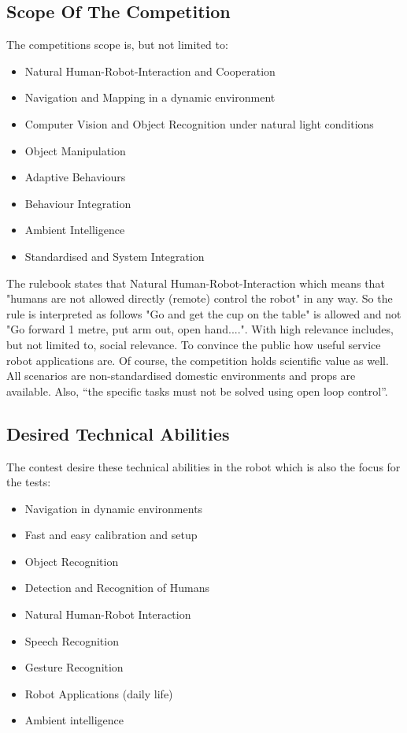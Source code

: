 \subsection{Scope Of The Competition}
The competitions scope is, but not limited to:
\vspace{0.15cm}

\begin{itemize}
    \item Natural Human-Robot-Interaction and Cooperation
    \item Navigation and Mapping in a dynamic environment
    \item Computer Vision and Object Recognition under natural light conditions
    \item Object Manipulation
    \item Adaptive Behaviours
    \item Behaviour Integration
    \item Ambient Intelligence
    \item Standardised and System Integration
\end{itemize}
\vspace{0.15cm}
\indent The rulebook states that Natural Human-Robot-Interaction which means that "humans are not allowed directly (remote) control the robot" in any way. So the rule is interpreted as follows "Go and get the cup on the table" is allowed and not "Go forward 1 metre, put arm out, open hand....". With high relevance includes, but not limited to, social relevance. To convince the public how useful service robot applications are. Of course, the competition holds scientific value as well. All scenarios are non-standardised domestic environments and props are available. Also, “the specific tasks must not be solved using open loop control”.\cite{robocup-rulebook}

\subsection{Desired Technical Abilities}\label{techab}
The contest desire these technical abilities in the robot which is also the focus for the tests:
\vspace{0.15cm}

\begin{itemize}
    \item Navigation in dynamic environments
    \item Fast and easy calibration and setup
    \item Object Recognition
    \item Detection and Recognition of Humans
    \item Natural Human-Robot Interaction
    \item Speech Recognition
    \item Gesture Recognition
    \item Robot Applications (daily life)
    \item Ambient intelligence
\end{itemize}

